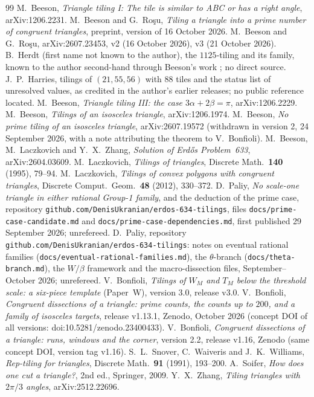 \documentclass[11pt,reqno]{amsart}
\theoremstyle{plain}
\theoremstyle{definition}
\begin{document}
\begin{thebibliography}{99}
 M.~Beeson, \emph{Triangle tiling I: The tile is similar to ABC or has a right angle}, arXiv:1206.2231.
 M.~Beeson and G.~Ro\c{s}u, \emph{Tiling a triangle into a prime number of congruent triangles}, preprint, version of 16 October 2026.
 M.~Beeson and G.~Ro\c{s}u, arXiv:2607.23453, v2 (16 October 2026), v3 (21 October 2026).
 B.~Herdt (first name not known to the author), the $1125$-tiling and its family, known to the author second-hand through Beeson's work \cite{BeesonRosu}; no direct source.
 J.~P.~Harries, tilings of $(21,55,56)$ with $88$ tiles and the status list of unresolved values, as credited in the author's earlier releases; no public reference located.
 M.~Beeson, \emph{Triangle tiling III: the case $3\alpha+2\beta=\pi$}, arXiv:1206.2229.
 M.~Beeson, \emph{Tilings of an isosceles triangle}, arXiv:1206.1974.
 M.~Beeson, \emph{No prime tiling of an isosceles triangle}, arXiv:2607.19572 (withdrawn in version 2, 24 September 2026, with a note attributing the theorem to V.~Bonfioli).
 M.~Beeson, M.~Laczkovich and Y.~X.~Zhang, \emph{Solution of Erd\H{o}s Problem~633}, arXiv:2604.03609.
 M.~Laczkovich, \emph{Tilings of triangles}, Discrete Math.\ \textbf{140} (1995), 79--94.
 M.~Laczkovich, \emph{Tilings of convex polygons with congruent triangles}, Discrete Comput.\ Geom.\ \textbf{48} (2012), 330--372.
 D.~Paliy, \emph{No scale-one triangle in either rational Group-1 family}, and the deduction of the prime case, repository \texttt{github.com/DenisUkranian/erdos-634-tilings}, files \texttt{docs/prime-case-candidate.md} and \texttt{docs/prime-case-dependencies.md}, first published 29 September 2026; unrefereed.
 D.~Paliy, repository \texttt{github.com/DenisUkranian/erdos-634-tilings}: notes on eventual rational families (\texttt{docs/eventual-rational-families.md}), the $\theta$-branch (\texttt{docs/theta-branch.md}), the $W/\beta$ framework and the macro-dissection files, September--October 2026; unrefereed.
 V.~Bonfioli, \emph{Tilings of $W_M$ and $T_M$ below the threshold scale: a six-piece template} (Paper~W), version 3.0, release v3.0.
 V.~Bonfioli, \emph{Congruent dissections of a triangle: prime counts, the counts up to $200$, and a family of isosceles targets}, release v1.13.1, Zenodo, October 2026 (concept DOI of all versions: doi:10.5281/zenodo.23400433).
 V.~Bonfioli, \emph{Congruent dissections of a triangle: runs, windows and the corner}, version 2.2, release v1.16, Zenodo (same concept DOI, version tag v1.16).
 S.~L.~Snover, C.~Waiveris and J.~K.~Williams, \emph{Rep-tiling for triangles}, Discrete Math.\ \textbf{91} (1991), 193--200.
 A.~Soifer, \emph{How does one cut a triangle?}, 2nd ed., Springer, 2009.
 Y.~X.~Zhang, \emph{Tiling triangles with $2\pi/3$ angles}, arXiv:2512.22696.
\end{thebibliography}
\end{document}
